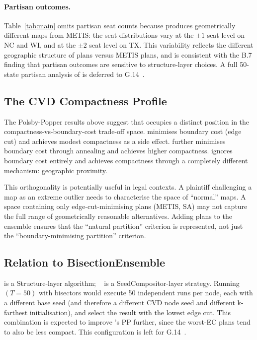 \paragraph{Partisan outcomes.}
Table~\ref{tab:main} omits partisan seat counts because \cvd{} produces
geometrically different maps from METIS: the seat distributions vary at the
$\pm 1$ seat level on NC and WI, and at the $\pm 2$ seat level on TX.
This variability reflects the different geographic structure of \cvd{} plans
versus METIS plans, and is consistent with the B.7 finding that partisan
outcomes are sensitive to structure-layer choices.
A full 50-state partisan analysis of \cvd{} is deferred to G.14~\citep{g14paper}.

\subsection{The CVD Compactness Profile}

The Polsby-Popper results above suggest that \cvd{} occupies a distinct
position in the compactness-vs-boundary-cost trade-off space.
\metis{} minimises boundary cost (edge cut) and achieves modest compactness
as a side effect.
\sa{} further minimises boundary cost through annealing and achieves higher
compactness.
\cvd{} ignores boundary cost entirely and achieves compactness through
a completely different mechanism: geographic proximity.

This orthogonality is potentially useful in legal contexts.
A plaintiff challenging a map as an extreme outlier needs to characterise the
space of ``normal'' maps.
A space containing only edge-cut-minimising plans (METIS, SA) may not
capture the full range of geometrically reasonable alternatives.
Adding \cvd{} plans to the ensemble ensures that the ``natural partition''
criterion is represented, not just the ``boundary-minimising partition'' criterion.

\subsection{Relation to BisectionEnsemble}

\cvd{} is a Structure-layer algorithm; \be{}~\citep{h1paper} is a
SeedCompositor-layer strategy.
Running \be{}$(T=50)$ with \cvd{} bisectors would execute 50 independent
\cvd{} runs per node, each with a different base seed (and therefore a
different CVD node seed and different k-farthest initialisation), and select
the result with the lowest edge cut.
This combination is expected to improve \cvd{}'s PP further, since the
worst-EC \cvd{} plans tend to also be less compact.
This configuration is left for G.14~\citep{g14paper}.
